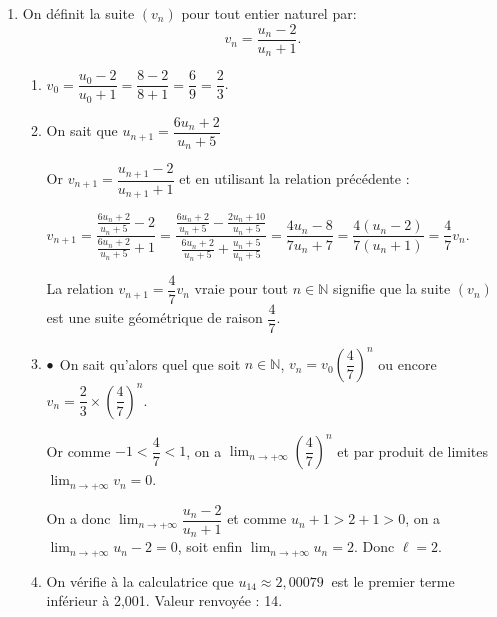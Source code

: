 \documentclass[10pt]{article}
\providecommand{\N}{\mathbb{N}}
\providecommand{\np}[2][]{{#2~#1}}
\begin{document}
\begin{enumerate}
\begin{enumerate}
Le signe du quotient précédent est donc celui de $2 - u_n$ ; or $u_n > 2 \implies $

$0 > 2 - u_n$, donc $u_{n+1} - u_n < 0$ ce qui signifie que la suite $\left(u_n\right)$ est décroissante.
		\item 
La suite $\left(u_n\right)$ étant décroissante et minorée par 2 est donc convergente vers une limite $\ell$, avec $\ell \geqslant 2$.
	\end{enumerate}
\item On définit la suite $\left(v_n\right)$ pour tout entier naturel par:
\[v_n = \dfrac{u_n - 2}{u_n + 1}.\]

	\begin{enumerate}
		\item 
$v_0 = \dfrac{u_0 - 2}{u_0 + 1} = \dfrac{8 - 2}{8 + 1} = \dfrac{6}{9} = \dfrac{2}{3}$.
		\item 
On sait que $u_{n +1} = \dfrac{6u_n + 2}{u_n +5}$
		
Or $v_{n+1} = \dfrac{u_{n+1} - 2}{u_{n+1} + 1}$ et en utilisant la relation précédente :

$v_{n+1} =  \dfrac{\frac{6u_n + 2}{u_n + 5} - 2}{\frac{6u_n + 2}{u_n + 5} + 1} = \dfrac{\frac{6u_n + 2}{u_n + 5} - \frac{2u_n + 10}{u_n + 5}}{\frac{6u_n + 2}{u_n + 5} + \frac{u_n + 5}{u_n + 5}} =\dfrac{4u_n - 8}{7u_n + 7} = \dfrac{4\left(u_n - 2\right)}{7\left(u_n + 1\right)} = \dfrac47 v_n$.

La relation $v_{n+1} = \dfrac47v_n$ vraie pour tout $n \in \N$ signifie que la suite $\left(v_n\right)$ est une suite géométrique de raison $\dfrac47$.
		\item 
$\bullet~~$On sait qu'alors quel que soit $n \in \N$, \: $v_n = v_0\left(\dfrac47\right)^n$ ou encore $v_n = \dfrac{2}{3}\times \left(\dfrac47\right)^n$.

Or comme $- 1 < \dfrac{4}{7} < 1$, on a $\displaystyle\lim_{n \to + \infty} \left(\dfrac47\right)^n$ et par produit de limites $\displaystyle\lim_{n \to + \infty}v_n = 0$.


On a donc $\displaystyle\lim_{n \to + \infty} \dfrac{u_n - 2}{u_n + 1}$ et comme $u_n + 1 > 2 + 1 > 0$, on a $\displaystyle\lim_{n \to + \infty} u_n - 2 = 0$, soit enfin $\displaystyle\lim_{n \to + \infty} u_n = 2$. Donc $\ell = 2$.























\item On vérifie à la calculatrice que $u_{14} \approx \np{2,00079}$ est le premier terme inférieur à 2,001. Valeur renvoyée : 14.
	\end{enumerate}
\end{enumerate}

\bigskip
\end{document}
